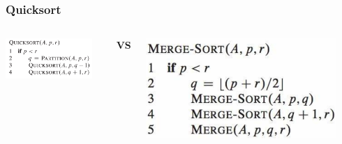 \documentclass[UTF8,11pt,handout]{beamer}
\begin{document}
\begin{frame}[t]
	\frametitle{Quicksort}

	\begin{center}
	\begin{columns}
		\begin{center}
			\includegraphics[width=0.9\textwidth]{figs/quicksort.png}
		\end{center}
		\begin{center}\textbf{\color{red}VS}
		\end{center}
		\begin{center}
			\includegraphics[width=0.9\textwidth]{figs/mergesort.png}
		\end{center}
	\end{columns}


\end{center}
\end{frame}
\end{document}
